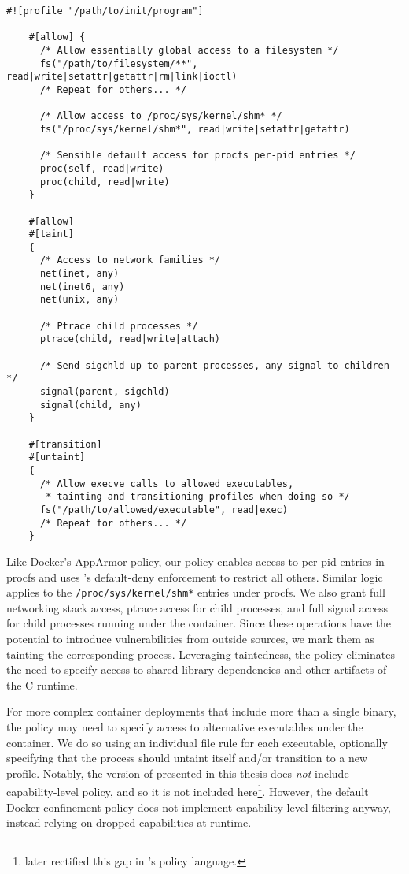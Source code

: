 \begin{lstlisting}[language=bpfbox, gobble=4,
  caption={[Implementing the default Docker policy in \bpfbox{}]
    Implementing the default Docker policy in \bpfbox{}.
    %\todo{High-level overview of the policy}
  },
  label={lst:bpfbox-docker-default}]
    #![profile "/path/to/init/program"]

    #[allow] {
      /* Allow essentially global access to a filesystem */
      fs("/path/to/filesystem/**", read|write|setattr|getattr|rm|link|ioctl)
      /* Repeat for others... */

      /* Allow access to /proc/sys/kernel/shm* */
      fs("/proc/sys/kernel/shm*", read|write|setattr|getattr)

      /* Sensible default access for procfs per-pid entries */
      proc(self, read|write)
      proc(child, read|write)
    }

    #[allow]
    #[taint]
    {
      /* Access to network families */
      net(inet, any)
      net(inet6, any)
      net(unix, any)

      /* Ptrace child processes */
      ptrace(child, read|write|attach)

      /* Send sigchld up to parent processes, any signal to children */
      signal(parent, sigchld)
      signal(child, any)
    }

    #[transition]
    #[untaint]
    {
      /* Allow execve calls to allowed executables,
       * tainting and transitioning profiles when doing so */
      fs("/path/to/allowed/executable", read|exec)
      /* Repeat for others... */
    }
\end{lstlisting}

Like Docker's AppArmor policy, our \bpfbox{} policy enables access to per-pid entries in
procfs and uses \bpfbox{}'s default-deny enforcement to restrict all others. Similar logic
applies to the \texttt{/proc/sys/kernel/shm*} entries under procfs. We also grant full
networking stack access, ptrace access for child processes, and full signal access for
child processes running under the container. Since these operations have the potential to
introduce vulnerabilities from outside sources, we mark them as tainting the corresponding
process. Leveraging taintedness, the \bpfbox{} policy eliminates the need to specify
access to shared library dependencies and other artifacts of the C runtime.

For more complex container deployments that include more than a single binary, the
\bpfbox{} policy may need to specify access to alternative executables under the
container.  We do so using an individual file rule for each executable, optionally
specifying that the process should untaint itself and/or transition to a new profile.
Notably, the version of \bpfbox{} presented in this thesis does \textit{not} include
capability-level policy, and so it is not included here\footnote{\bpfcontain{} later
rectified this gap in \bpfbox{}'s policy language.}. However, the default Docker
confinement policy does not implement capability-level filtering anyway, instead relying
on dropped capabilities at runtime.

